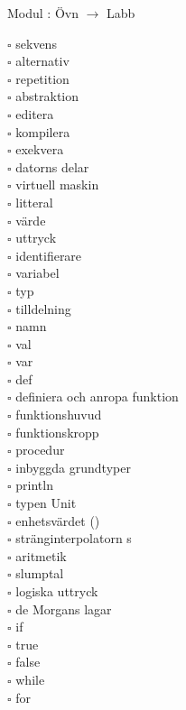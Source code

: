 
    Modul : Övn  $\rightarrow$ Labb 
    \begin{multicols}{3}\SlideFontTiny
    $\square$ sekvens \\
$\square$ alternativ \\
$\square$ repetition \\
$\square$ abstraktion \\
$\square$ editera \\
$\square$ kompilera \\
$\square$ exekvera \\
$\square$ datorns delar \\
$\square$ virtuell maskin \\
$\square$ litteral \\
$\square$ värde \\
$\square$ uttryck \\
$\square$ identifierare \\
$\square$ variabel \\
$\square$ typ \\
$\square$ tilldelning \\
$\square$ namn \\
$\square$ val \\
$\square$ var \\
$\square$ def \\
$\square$ definiera och anropa funktion \\
$\square$ funktionshuvud \\
$\square$ funktionskropp \\
$\square$ procedur \\
$\square$ inbyggda grundtyper \\
$\square$ println \\
$\square$ typen Unit \\
$\square$ enhetsvärdet () \\
$\square$ stränginterpolatorn s \\
$\square$ aritmetik \\
$\square$ slumptal \\
$\square$ logiska uttryck \\
$\square$ de Morgans lagar \\
$\square$ if \\
$\square$ true \\
$\square$ false \\
$\square$ while \\
$\square$ for \\
    \end{multicols}
    